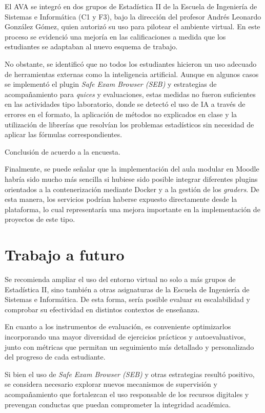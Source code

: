 \documentclass[letter,oneside,12pt,spanish]{report}
\begin{document}
El AVA se integró en dos grupos de Estadística II de la Escuela de Ingeniería de Sistemas e Informática (C1 y F3), bajo la dirección del profesor Andrés Leonardo González Gómez, quien autorizó su uso para pilotear el ambiente virtual. En este proceso se evidenció una mejoría en las calificaciones a medida que los estudiantes se adaptaban al nuevo esquema de trabajo.

No obstante, se identificó que no todos los estudiantes hicieron un uso adecuado de herramientas externas como la inteligencia artificial. Aunque en algunos casos se implementó el plugin \textit{Safe Exam Browser (SEB)} y estrategias de acompañamiento para \textit{quices} y evaluaciones, estas medidas no fueron suficientes en las actividades tipo laboratorio, donde se detectó el uso de IA a través de errores en el formato, la aplicación de métodos no explicados en clase y la utilización de librerías que resolvían los problemas estadísticos sin necesidad de aplicar las fórmulas correspondientes.

Conclusión de acuerdo a la encuesta.

Finalmente, se puede señalar que la implementación del aula modular en Moodle habría sido mucho más sencilla si hubiese sido posible integrar diferentes plugins orientados a la contenerización mediante Docker y a la gestión de los \textit{graders}. De esta manera, los servicios podrían haberse expuesto directamente desde la plataforma, lo cual representaría una mejora importante en la implementación de proyectos de este tipo.

\section{Trabajo a futuro}

Se recomienda ampliar el uso del entorno virtual no solo a más grupos de Estadística II, sino también a otras asignaturas de la Escuela de Ingeniería de Sistemas e Informática. De esta forma, sería posible evaluar su escalabilidad y comprobar su efectividad en distintos contextos de enseñanza.

En cuanto a los instrumentos de evaluación, es conveniente optimizarlos incorporando una mayor diversidad de ejercicios prácticos y autoevaluativos, junto con métricas que permitan un seguimiento más detallado y personalizado del progreso de cada estudiante.

Si bien el uso de \textit{Safe Exam Browser (SEB)} y otras estrategias resultó positivo, se considera necesario explorar nuevos mecanismos de supervisión y acompañamiento que fortalezcan el uso responsable de los recursos digitales y prevengan conductas que puedan comprometer la integridad académica.
\end{document}
